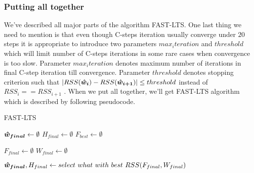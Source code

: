 \subsubsection{Putting all together}
We've described all major parts of the algorithm FAST-LTS. One last thing we need to mention is that even though C-steps iteration usually converge under $20$ steps it is appropriate to introduce two parameters $max_iteration$ and $threshold$ which will limit number of C-steps iterations in some rare cases when convergence is too slow. Parameter $max_iteration$ denotes maximum number of iterations in final C-step iteration till convergence. Parameter $threshold$ denotes stopping criterion such that $| RSS(\boldsymbol{\hat{w}_{i}}) - RSS(\boldsymbol{\hat{w}_{i+1}})| \leq threshold$ instead of 
$RSS_{i} == RSS_{i+1}$ . When we put all together, we'll get FAST-LTS algorithm which is described by following pseudocode.


\begin{algorithm}[H]
	\label{alg:FAST-LTS}
	\caption{FAST-LTS}
	$\boldsymbol{\hat{w}_{final}} \gets \emptyset$\;
	$H_{final} \gets \emptyset$\;
	$F_{best} \gets \emptyset$\;


	$F_{final} \gets \emptyset$\;
	$W_{final} \gets \emptyset$\;

	$\boldsymbol{\hat{w}_{final}}, H_{final} \gets select~what~with~best~RSS(F_{final}, W_{final})$\;

	\;
\end{algorithm}


